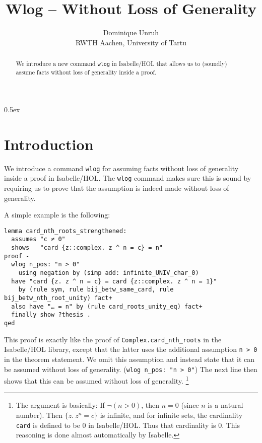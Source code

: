 \documentclass[11pt,a4paper]{article}
\begin{document}
\title{Wlog -- Without Loss of Generality}
\author{Dominique Unruh\\
 \footnotesize RWTH Aachen, University of Tartu}
\maketitle

\begin{abstract}
  We introduce a new command \texttt{wlog} in Isabelle/HOL that allows us to (soundly) assume
  facts without loss of generality inside a proof.
\end{abstract}

\tableofcontents

\parindent 0pt\parskip 0.5ex

\section{Introduction}

We introduce a command \texttt{wlog} for assuming facts without loss of generality inside a proof in Isabelle/HOL.
The \texttt{wlog} command makes sure this is sound by requiring us to prove that the assumption is indeed made without loss of generality.

A simple example is the following:
\begin{verbatim}
lemma card_nth_roots_strengthened:
  assumes "c ≠ 0"
  shows   "card {z::complex. z ^ n = c} = n"
proof -
  wlog n_pos: "n > 0"
    using negation by (simp add: infinite_UNIV_char_0)
  have "card {z. z ^ n = c} = card {z::complex. z ^ n = 1}"
    by (rule sym, rule bij_betw_same_card, rule bij_betw_nth_root_unity) fact+
  also have "… = n" by (rule card_roots_unity_eq) fact+
  finally show ?thesis .
qed
\end{verbatim}

This proof is exactly like the proof of \verb|Complex.card_nth_roots| in the Isabelle/HOL library,
except that the latter uses the additional assumption \texttt{n > 0} in the theorem statement.
We omit this assumption and instead state that it can be assumed without loss of generality.
(\verb|wlog n_pos: "n > 0"|)
The next line then shows that this can be assumed without loss of generality.%
\footnote{The argument is basically:
  If $\lnot(n>0)$, then $n=0$ (since $n$ is a natural number).
  Then $\{z.\ z^n = c\}$ is infinite, and for infinite sets, the cardinality \texttt{card}
  is defined to be $0$ in Isabelle/HOL.
  Thus that cardinality is $0$.
  This reasoning is done almost automatically by Isabelle.}
\end{document}
